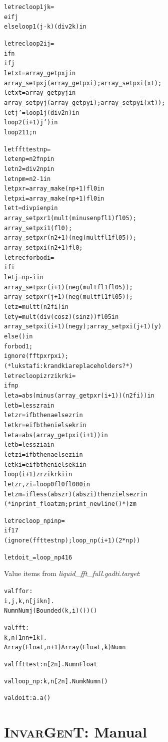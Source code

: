\documentclass{article}
\newcommand{\tmem}[1]{{\em #1\/}}
\newcommand{\tmname}[1]{\textsc{#1}}
\newenvironment{tmcode}[1][]{\begin{alltt}}{\end{alltt}}
\begin{document}
\begin{tmcode}
  let rec loop1 j k =
    eif j 
    else loop1 (j - k) (div2 k) in

  let rec loop2 i j =
    if n 
      if j 
        let xt = array_get px j in
        array_set px j (array_get px i); array_set px i (xt);
        let xt = array_get py j in
        array_set py j (array_get py i); array_set py i (xt));
      let j' = loop1 j (div2 n) in
      loop2 (i + 1) j') in
  loop2 1 1; n

let ffttest np =
  let enp = n2f np in
  let n2 = div2 np in
  let npm = n2 - 1 in
  let pxr = array_make (np+1) fl0 in
  let pxi = array_make (np+1) fl0 in
  let t = div pi enp in
  array_set pxr 1 (mult (minus enp fl1) fl05);
  array_set pxi 1 (fl0);
  array_set pxr (n2+1) (neg (mult fl1 fl05));
  array_set pxi (n2+1) fl0;
  let rec forbod i =
    if i 
      let j = np - i in
      array_set pxr (i+1) (neg (mult fl1 fl05));
      array_set pxr (j+1) (neg (mult fl1 fl05));
      let z = mult t (n2f i) in
      let y = mult (div (cos z) (sin z)) fl05 in
      array_set pxi (i+1) (neg y); array_set pxi (j+1) (y)
    else () in
  forbod 1;
  ignore (fft pxr pxi);
  (* lukstafi: kr and ki are placeholders? *)
  let rec loop i zr zi kr ki =
    if np 
      let a = abs (minus (array_get pxr (i+1)) (n2f i)) in
      let b = less zr a in
      let zr = if b then a else zr in
      let kr = eif b then i else kr in
      let a = abs (array_get pxi (i+1)) in
      let b = less zi a in
      let zi = if b then a else zi in
      let ki = eif b then i else ki in
      loop (i+1) zr zi kr ki in
  let zr, zi = loop 0 fl0 fl0 0 0 in
  let zm = if less (abs zr) (abs zi) then zi else zr in
  (*in print_float zm; print_newline ()*) zm

let rec loop_np i np =
  if 17 
  ( ignore (ffttest np); loop_np (i + 1) (2 * np) )

let doit _ = loop_np 4 16
\end{tmcode}
Value items from {\tmem{liquid\_fft\_full.gadti.target}}:
\begin{tmcode}
val ffor :
   i, j, k, n[j  i  k  n].
   Num n  Num j  (Bounded (k, i)  ())  ()

val fft :
   k, n[1  n  n + 1  k].
   Array (Float, n + 1)  Array (Float, k)  Num n

val ffttest : n[2  n]. Num n  Float

val loop_np : k, n[2  n]. Num k  Num n  ()

val doit : a. a  ()
\end{tmcode}

\chapter{{\tmname{InvarGenT}}: Manual}
\end{document}

